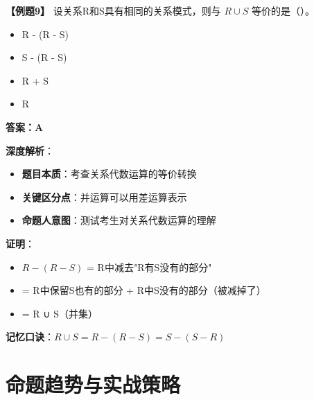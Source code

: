 \documentclass[12pt, a4paper]{article}
\newenvironment{bluebox}[1]{%
  \begin{trivlist}
  \item[\hskip\labelsep \textbf{#1}]
  \setlength{\parskip}{0.5ex}
  \setlength{\itemsep}{0.5ex}
}{%
  \end{trivlist}
}
\begin{document}
\begin{bluebox}{例题9：关系运算等价}
	\textbf{【例题9】} 设关系R和S具有相同的关系模式，则与 $R \cup S$ 等价的是（\quad）。

	\begin{itemize}
		\item[A)] R - (R - S)
		\item[B)] S - (R - S)
		\item[C)] R + S
		\item[D)] R
	\end{itemize}

	\textbf{答案：A}

	\textbf{深度解析}：

	\begin{itemize}
		\item \textbf{题目本质}：考查关系代数运算的等价转换
		\item \textbf{关键区分点}：并运算可以用差运算表示
		\item \textbf{命题人意图}：测试考生对关系代数运算的理解
	\end{itemize}

	\textbf{证明}：
	\begin{itemize}
		\item $R - (R - S)$ = R中减去"R有S没有的部分"
		\item = R中保留S也有的部分 + R中S没有的部分（被减掉了）
		\item = R ∪ S（并集）
	\end{itemize}

	\textbf{记忆口诀}：$R \cup S = R - (R - S) = S - (S - R)$
\end{bluebox}

\section{命题趋势与实战策略}
\end{document}
